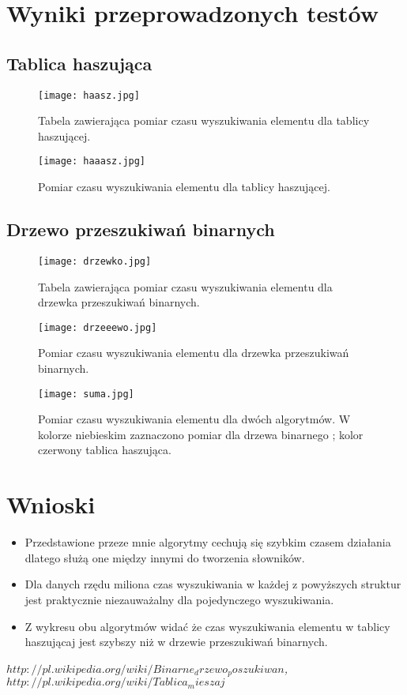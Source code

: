 \documentclass[11pt]{article}
\begin{document}
\newpage
\section{Wyniki przeprowadzonych testów}
\subsection{Tablica haszująca}


 
  \begin{figure}[ht!] 
\centering
 \texttt{[image: haasz.jpg]}
 \caption{Tabela zawierająca pomiar czasu wyszukiwania elementu dla tablicy haszującej. } 
\label{Wykresie nr 1}
 \end{figure}

 \begin{figure}[ht!] 
\centering
 \texttt{[image: haaasz.jpg]}
 \caption{Pomiar czasu wyszukiwania elementu dla tablicy haszującej. } 
\label{overflow}
 \end{figure}
 \newpage
\subsection{Drzewo przeszukiwań binarnych }

 
 \begin{figure}[ht!] 
\centering
 \texttt{[image: drzewko.jpg]}
 \caption{Tabela zawierająca pomiar czasu wyszukiwania elementu dla drzewka przeszukiwań binarnych. } 
\label{overflow}
 \end{figure}

  \begin{figure}[ht!] 
\centering
 \texttt{[image: drzeeewo.jpg]}
 \caption{Pomiar czasu wyszukiwania elementu dla drzewka przeszukiwań binarnych. } 
\label{Wykres nr 4}
 \end{figure}
 
   \begin{figure}[ht!] 
\centering
 \texttt{[image: suma.jpg]}
 \caption{Pomiar czasu wyszukiwania elementu dla dwóch algorytmów. W kolorze niebieskim zaznaczono pomiar dla drzewa binarnego ; kolor czerwony tablica haszująca. } 
\label{overflow}
 \end{figure}
 
\newpage
\section{Wnioski}
\begin{itemize}
\item Przedstawione przeze mnie algorytmy cechują się szybkim czasem działania dlatego służą one między innymi do tworzenia słowników.
\item Dla danych rzędu miliona czas wyszukiwania w każdej z powyższych struktur jest praktycznie niezauważalny dla pojedynczego wyszukiwania.
\item Z wykresu obu algorytmów widać że czas wyszukiwania elementu w tablicy haszującaj jest szybszy niż w drzewie przeszukiwań binarnych.
\end{itemize} 

\begin{thebibliography}{99}
\emph{$ http://pl.wikipedia.org/wiki/Binarne_drzewo_poszukiwan$,}
\emph{$http://pl.wikipedia.org/wiki/Tablica_mieszaj$}
\end{thebibliography}
\end{document}
